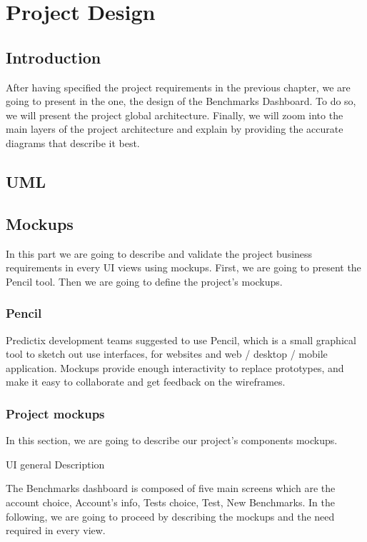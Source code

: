 \chapter{Project Design}

\section*{Introduction}
After having specified the project requirements in the  previous chapter, we are
going to present in the one,  the design of the Benchmarks Dashboard. To do so,
we will present the project global architecture. Finally, we will zoom into the
main layers of the project architecture and explain by providing the accurate
diagrams that describe it best.
\pagebreak

\section{UML}

\section{Mockups}
In this part we are going to describe and validate the project business
requirements in every UI views using mockups. First, we are going to present the
Pencil tool. Then we are going to define the project's mockups.

\subsection{Pencil}
Predictix development teams suggested to use Pencil, which is a small graphical
tool to sketch out use interfaces, for websites and web / desktop / mobile
application. Mockups provide enough interactivity to replace prototypes, and
make it easy to collaborate and get feedback on the wireframes.

\subsection{Project mockups}
In this section, we are going to describe our project's components mockups.

UI general Description

The Benchmarks dashboard is composed of five main screens which are the account
choice, Account's info, Tests choice, Test, New Benchmarks. In the following,
we are going to proceed by describing the mockups and the need required in every
view.

